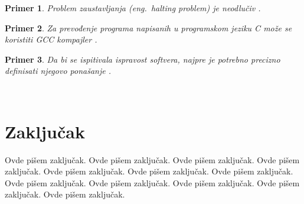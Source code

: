 \documentclass[a4paper]{article}
\newtheorem{primer}{Primer}[section]
\begin{document}
\begin{primer}
Problem zaustavljanja (eng.~{\em halting problem}) je neodlučiv \cite{haltingproblem}.
\end{primer}

\begin{primer}
Za prevođenje programa napisanih u programskom jeziku C može se koristiti GCC kompajler \cite{gcc}.
\end{primer}

\begin{primer}
 Da bi se ispitivala ispravost softvera, najpre je potrebno precizno definisati njegovo ponašanje \cite{laski2009software}. 
\end{primer}

\



\section{Zaključak}
\label{sec:zakljucak}

Ovde pišem zaključak. 
Ovde pišem zaključak. 
Ovde pišem zaključak. 
Ovde pišem zaključak. 
Ovde pišem zaključak. 
Ovde pišem zaključak. 
Ovde pišem zaključak. 
Ovde pišem zaključak. 
Ovde pišem zaključak. 
Ovde pišem zaključak. 
Ovde pišem zaključak. 
Ovde pišem zaključak. 


\appendix
 


\appendix
\end{document}
